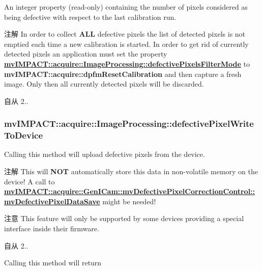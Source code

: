 An integer property {\bfseries }(read-\/only) containing the number of pixels considered as being defective with respect to the last calibration run. 

\begin{DoxyNote}{注解}
In order to collect {\bfseries A\+L\+L} defective pixels the list of detected pixels is not emptied each time a new calibration is started. In order to get rid of currently detected pixels an application must set the property {\bfseries \hyperlink{classmv_i_m_p_a_c_t_1_1acquire_1_1_image_processing_ae1e060a70ed836297ef3886db0bf8a95}{mv\+I\+M\+P\+A\+C\+T\+::acquire\+::\+Image\+Processing\+::defective\+Pixels\+Filter\+Mode}} to {\bfseries mv\+I\+M\+P\+A\+C\+T\+::acquire\+::dpfm\+Reset\+Calibration} and then capture a fresh image. Only then all currently detected pixels will be discarded.
\end{DoxyNote}
\begin{DoxySince}{自从}
2.. 
\end{DoxySince}
\hypertarget{classmv_i_m_p_a_c_t_1_1acquire_1_1_image_processing_a7fc7e71de3b649a80d02ae944471eb1b}{
\subsubsection[{defective\+Pixel\+Write\+To\+Device}]{ mv\+I\+M\+P\+A\+C\+T\+::acquire\+::\+Image\+Processing\+::defective\+Pixel\+Write\+To\+Device}}\label{classmv_i_m_p_a_c_t_1_1acquire_1_1_image_processing_a7fc7e71de3b649a80d02ae944471eb1b}


Calling this method will upload defective pixels from the device. 

\begin{DoxyNote}{注解}
This will {\bfseries N\+O\+T} automatically store this data in non-\/volatile memory on the device! A call to {\bfseries \hyperlink{classmv_i_m_p_a_c_t_1_1acquire_1_1_gen_i_cam_1_1mv_defective_pixel_correction_control_a4acdf44b93d160f06022d1e52f5b1e42}{mv\+I\+M\+P\+A\+C\+T\+::acquire\+::\+Gen\+I\+Cam\+::mv\+Defective\+Pixel\+Correction\+Control\+::mv\+Defective\+Pixel\+Data\+Save}} might be needed!
\end{DoxyNote}
\begin{DoxyAttention}{注意}
This feature will only be supported by some devices providing a special interface inside their firmware.
\end{DoxyAttention}
\begin{DoxySince}{自从}
2..
\end{DoxySince}
Calling this method will return ~\newline

